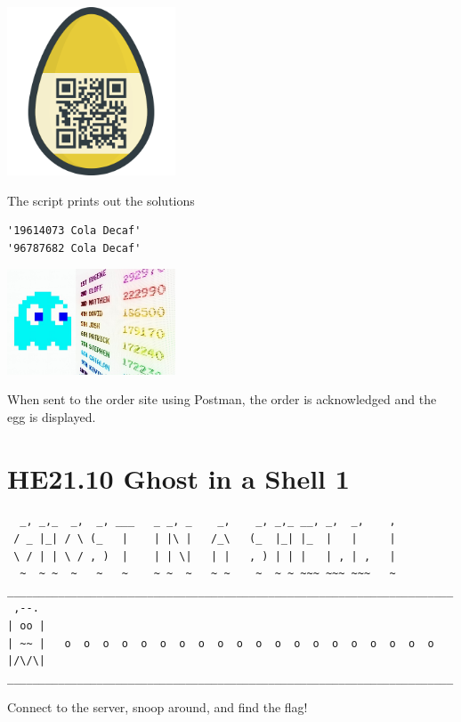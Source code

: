 \documentclass[english,a4paper,nols,noindent]{tufte-handout}
\begin{document}
\begin{marginfigure}
    \includegraphics[width=50mm]{ch09/7ef384aa6ec128ef.png}
\end{marginfigure}

The script prints out the solutions
\begin{verbatim}
'19614073 Cola Decaf'
'96787682 Cola Decaf'
\end{verbatim}

\begin{marginfigure}
    \includegraphics[width=50mm]{images/challenge10.jpg}
\end{marginfigure}

When sent to the order site using Postman, the order is acknowledged and the
egg is displayed.


\hypertarget{he21.10}{%
\section{HE21.10 Ghost in a Shell 1}\label{he21.10}}
{\footnotesize \begin{verbatim}
  _, _,_  _,  _, ___   _ _, _    _,    _, _,_ __, _,  _,    ,  
 / _ |_| / \ (_   |    | |\ |   /_\   (_  |_| |_  |   |     |  
 \ / | | \ / , )  |    | | \|   | |   , ) | | |   | , | ,   |  
  ~  ~ ~  ~   ~   ~    ~ ~  ~   ~ ~    ~  ~ ~ ~~~ ~~~ ~~~   ~  
______________________________________________________________________  
 ,--.    
| oo |   
| ~~ |   o  o  o  o  o  o  o  o  o  o  o  o  o  o  o  o  o  o  o  o  
|/\/\|   
______________________________________________________________________  
\end{verbatim}}
Connect to the server, snoop around, and find the flag!
\end{document}
